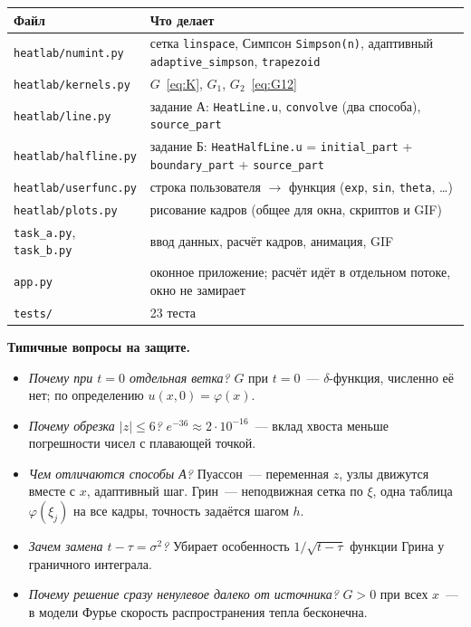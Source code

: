 \documentclass[a4paper,12pt]{article}
\newcommand{\code}[1]{\texttt{#1}}
\begin{document}
\begin{table}[H]
\centering
\begin{tabularx}{\textwidth}{@{}l X@{}}
\toprule
Файл & Что делает\\
\midrule
\code{heatlab/numint.py} & сетка \code{linspace}, Симпсон \code{Simpson(n)}, адаптивный \code{adaptive\_simpson}, \code{trapezoid}\\
\code{heatlab/kernels.py} & $G$~\eqref{eq:K}, $G_1$, $G_2$~\eqref{eq:G12}\\
\code{heatlab/line.py} & задание А: \code{HeatLine.u}, \code{convolve} (два способа), \code{source\_part}\\
\code{heatlab/halfline.py} & задание Б: \code{HeatHalfLine.u} = \code{initial\_part} + \code{boundary\_part} + \code{source\_part}\\
\code{heatlab/userfunc.py} & строка пользователя $\to$ функция (\code{exp}, \code{sin}, \code{theta}, \dots)\\
\code{heatlab/plots.py} & рисование кадров (общее для окна, скриптов и GIF)\\
\code{task\_a.py}, \code{task\_b.py} & ввод данных, расчёт кадров, анимация, GIF\\
\code{app.py} & оконное приложение; расчёт идёт в отдельном потоке, окно не замирает\\
\code{tests/} & 23 теста\\
\bottomrule
\end{tabularx}
\end{table}

\textbf{Типичные вопросы на защите.}
\begin{itemize}
  \item \emph{Почему при $t=0$ отдельная ветка?} $G$ при $t=0$~--- $\delta$-функция,
        численно её нет; по определению $u(x,0)=\varphi(x)$.
  \item \emph{Почему обрезка $|z|\le6$?} $e^{-36}\approx2\cdot10^{-16}$~--- вклад
        хвоста меньше погрешности чисел с плавающей точкой.
  \item \emph{Чем отличаются способы А?} Пуассон~--- переменная $z$, узлы
        движутся вместе с $x$, адаптивный шаг. Грин~--- неподвижная сетка по $\xi$,
        одна таблица $\varphi(\xi_j)$ на все кадры, точность задаётся шагом $h$.
  \item \emph{Зачем замена $t-\tau=\sigma^2$?} Убирает особенность $1/\sqrt{t-\tau}$
        функции Грина у граничного интеграла.
  \item \emph{Почему решение сразу ненулевое далеко от источника?} $G>0$ при всех $x$~---
        в модели Фурье скорость распространения тепла бесконечна.
\end{itemize}
\end{document}
